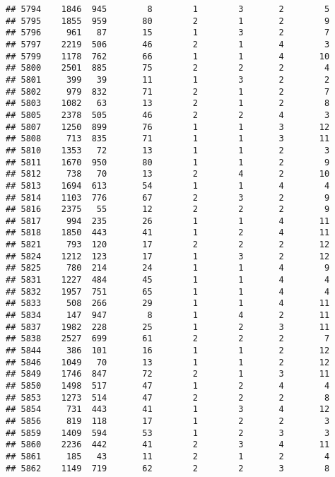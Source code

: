 \documentclass[]{article}
\begin{document}
\begin{verbatim}
## 5794    1846  945        8        1        3       2        5
## 5795    1855  959       80        2        1       2        9
## 5796     961   87       15        1        3       2        7
## 5797    2219  506       46        2        1       4        3
## 5799    1178  762       66        1        1       4       10
## 5800    2501  885       75        2        2       2        4
## 5801     399   39       11        1        3       2        2
## 5802     979  832       71        2        1       2        7
## 5803    1082   63       13        2        1       2        8
## 5805    2378  505       46        2        2       4        3
## 5807    1250  899       76        1        1       3       12
## 5808     713  835       71        1        1       3       11
## 5810    1353   72       13        1        1       2        3
## 5811    1670  950       80        1        1       2        9
## 5812     738   70       13        2        4       2       10
## 5813    1694  613       54        1        1       4        4
## 5814    1103  776       67        2        3       2        9
## 5816    2375   55       12        2        2       2        9
## 5817     994  235       26        1        1       4       11
## 5818    1850  443       41        1        2       4       11
## 5821     793  120       17        2        2       2       12
## 5824    1212  123       17        1        3       2       12
## 5825     780  214       24        1        1       4        9
## 5831    1227  484       45        1        1       4        4
## 5832    1957  751       65        1        1       4        4
## 5833     508  266       29        1        1       4       11
## 5834     147  947        8        1        4       2       11
## 5837    1982  228       25        1        2       3       11
## 5838    2527  699       61        2        2       2        7
## 5844     386  101       16        1        1       2       12
## 5846    1049   70       13        1        1       2       12
## 5849    1746  847       72        2        1       3       11
## 5850    1498  517       47        1        2       4        4
## 5853    1273  514       47        2        2       2        8
## 5854     731  443       41        1        3       4       12
## 5856     819  118       17        1        2       2        3
## 5859    1409  594       53        1        2       3        3
## 5860    2236  442       41        2        3       4       11
## 5861     185   43       11        2        1       2        4
## 5862    1149  719       62        2        2       3        8

\end{verbatim}
\end{document}
